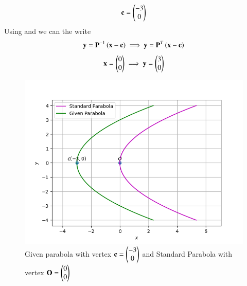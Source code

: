 \documentclass[journal,12pt,twocolumn]{IEEEtran}
\begin{document}
\begin{align}
\mathbf{c}=\begin{pmatrix}-3\\0\end{pmatrix}
\end{align}
Using  and  we can the write
\begin{align}
\mathbf{y}=\mathbf{P}^{-1}\left(\mathbf{x}-\mathbf{c}\right)\implies\mathbf{y}=\mathbf{P}^{T}\left(\mathbf{x}-\mathbf{c}\right)
\end{align}
\begin{align}
\mathbf{x}=\begin{pmatrix}0\\0\end{pmatrix}\implies\mathbf{y}=\begin{pmatrix}3\\0\end{pmatrix}
\end{align}
\begin{figure}[ht!]
       \centering
        \includegraphics[width =\linewidth]{Parabola1.png}
        \caption{Given parabola with vertex $\mathbf{c}=\begin{pmatrix}-3\\0\end{pmatrix}$ and Standard Parabola with vertex $\mathbf{O}=\begin{pmatrix}0\\0\end{pmatrix}$}\label{t1}
\end{figure}
\end{document}
